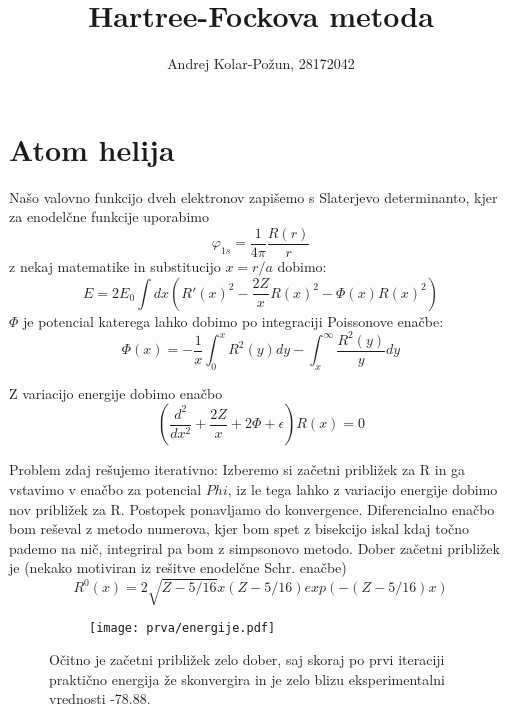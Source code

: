 \documentclass{article}
\title{Hartree-Fockova metoda}
\author{Andrej Kolar-Požun, 28172042}
\begin{document}
\maketitle
\newpage
{}
\section{Atom helija}
Našo valovno funkcijo dveh elektronov zapišemo s Slaterjevo determinanto, kjer za enodelčne funkcije uporabimo
\begin{equation*}
\varphi_{1s} = \frac{1}{4\pi} \frac{R(r)}{r}
\end{equation*}
z nekaj matematike in substitucijo $x=r/a$ dobimo:
\begin{equation*}
E = 2E_0 \int dx \left( R'(x)^2 - \frac{2Z}{x} R(x)^2 - \Phi(x) R(x)^2 \right)
\end{equation*}
$\Phi$ je potencial katerega lahko dobimo po integraciji Poissonove enačbe:
\begin{equation*}
\Phi(x) =- \frac{1}{x} \int_0^x R^2(y) dy - \int_x^{\infty} \frac{R^2(y)}{y} dy
\end{equation*}

Z variacijo energije dobimo enačbo
\begin{equation*}
\left( \frac{d^2}{dx^2} + \frac{2Z}{x} + 2 \Phi + \epsilon \right) R(x) = 0
\end{equation*}

Problem zdaj rešujemo iterativno: Izberemo si začetni približek za R in ga vstavimo v enačbo za potencial $Phi$, iz le tega lahko z variacijo energije dobimo nov približek za R. Postopek ponavljamo do konvergence.
Diferencialno enačbo bom reševal z metodo numerova, kjer bom spet z bisekcijo iskal kdaj točno pademo na nič, integriral pa bom z simpsonovo metodo.
Dober začetni približek je (nekako motiviran iz rešitve enodelčne Schr. enačbe)
\begin{equation*}
R^0(x) = 2 \sqrt{Z-5/16} x (Z-5/16) exp(-(Z-5/16)x)
\end{equation*}

\begin{figure}[H]
\centering
\begin{subfigure}{.6\textwidth}
\texttt{[image: prva/energije.pdf]}
\end{subfigure}
\caption*{Očitno je začetni približek zelo dober, saj skoraj po prvi iteraciji praktično energija že skonvergira in je zelo blizu eksperimentalni vrednosti -78.88.}
\end{figure}
\end{document}
